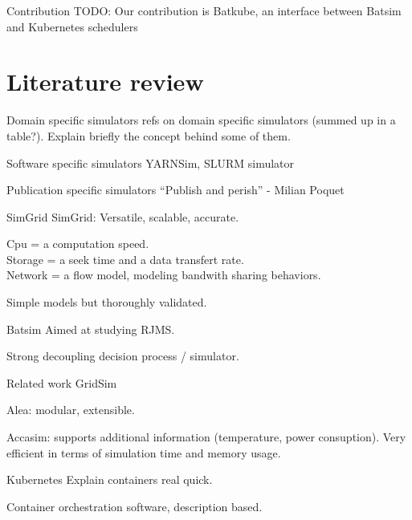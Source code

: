 \documentclass[12pt, aspectratio=43]{beamer}
\begin{document}
\begin{frame}{Contribution}
	TODO: Our contribution is Batkube, an interface between Batsim and
	Kubernetes schedulers
\end{frame}

\section{Literature review}
\begin{frame}{Domain specific simulators}
	refs on domain specific simulators (summed up in a table?). Explain
	briefly the concept behind some of them.
\end{frame}

\begin{frame}{Software specific simulators}
	YARNSim, SLURM simulator
\end{frame}

\begin{frame}{Publication specific simulators}
	``Publish and perish'' - Milian Poquet
\end{frame}

\begin{frame}{SimGrid}
	SimGrid: Versatile, scalable, accurate.

	Cpu = a computation speed.\\
	Storage = a seek time and a data transfert rate.\\
	Network = a flow model, modeling bandwith sharing behaviors.

	Simple models but thoroughly validated.
\end{frame}

\begin{frame}{Batsim}
	Aimed at studying RJMS.

	Strong decoupling decision process / simulator.
\end{frame}

\begin{frame}{Related work}
	GridSim

	Alea: modular, extensible.

	Accasim: supports additional information (temperature, power
	consuption). Very efficient in terms of simulation time and memory
	usage.
\end{frame}

\begin{frame}{Kubernetes}
	Explain containers real quick.

	Container orchestration software, description based.
\end{frame}
\end{document}
